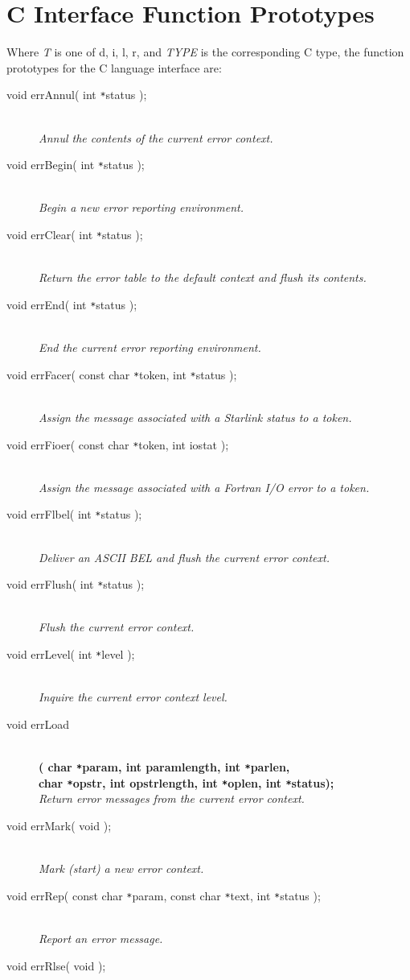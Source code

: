 \documentclass[twoside,11pt]{article}
\newcommand{\xlabel}[1]{}
\renewcommand{\_}{\texttt{\symbol{95}}}
\newcommand{\listline}{\hspace{1pt}\\}
\newcommand{\listline}{}
\begin{document}
\section{\xlabel{c_interface_function_prototypes}C Interface Function Prototypes} \label{C_sect}
Where \textit{T} is one of d, i, l, r, and \textit{TYPE} is the corresponding C
type, the function prototypes for the C language interface are:
\begin{description}
\item[void errAnnul( int \texttt{*}status );] \listline
\textit{Annul the contents of the current error context.}
\item[void errBegin( int \texttt{*}status );] \listline
\textit{Begin a new error reporting environment.}
\item[void errClear( int \texttt{*}status );] \listline
\textit{Return the error table to the default context and flush its contents.}
\item[void errEnd( int \texttt{*}status );] \listline
\textit{End the current error reporting environment.}
\item[void errFacer( const char \texttt{*}token, int \texttt{*}status );] \listline
\textit{Assign the message associated with a Starlink status to a token.}
\item[void errFioer( const char \texttt{*}token, int iostat );] \listline
\textit{Assign the message associated with a Fortran I/O error to a token.}
\item[void errFlbel( int \texttt{*}status );] \listline
\textit{Deliver an ASCII BEL and flush the current error context.}
\item[void errFlush( int \texttt{*}status );] \listline
\textit{Flush the current error context.}
\item[void errLevel( int \texttt{*}level );] \listline
\textit{Inquire the current error context level.}
\item[void errLoad] \listline
\textbf{( char \texttt{*}param, int param\_length, int
\texttt{*}parlen,  {\listline}
char \texttt{*}opstr, int opstr\_length, int \texttt{*}oplen,
int \texttt{*}status);} \\
\textit{Return error messages from the current error context.}
\item[void errMark( void );] \listline
\textit{Mark (start) a new error context.}
\item[void errRep( const char \texttt{*}param, const char \texttt{*}text, 
int \texttt{*}status );] \listline
\textit{Report an error message.}
\item[void errRlse( void );] \listline

\end{description}
\end{document}
